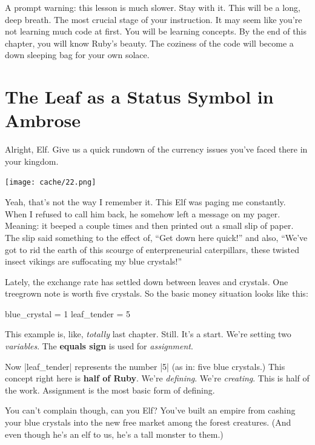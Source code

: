 \documentclass[12pt,twoside]{report}
\begin{document}
A prompt warning: this lesson is much slower.  Stay with it.  This
will be a long, deep breath. The most crucial stage of your
instruction.  It may seem like you're not learning much code at first.
You will be learning concepts.  By the end of this chapter, you will
know Ruby's beauty.  The coziness of the code will become a down
sleeping bag for your own solace.


\section{The Leaf as a Status Symbol in Ambrose}


Alright, Elf.  Give us a quick rundown of the currency issues you've
faced there in your kingdom.


\vspace{6pt}

	\texttt{[image: cache/22.png]}

\vspace{6pt}

Yeah, that's not the way I remember it.  This Elf was paging me
constantly.  When I refused to call him back, he somehow left a
message on my pager.  Meaning: it beeped a couple times and then
printed out a small slip of paper.  The slip said something to the
effect of, ``Get down here quick!'' and also, ``We've got to rid the
earth of this scourge of enterpreneurial caterpillars, these twisted
insect vikings are suffocating my blue crystals!''

Lately, the exchange rate has settled down between leaves and
crystals.  One treegrown note is worth five crystals.  So the basic
money situation looks like this:


\begin{rubycode}

 blue_crystal = 1 
 leaf_tender = 5

\end{rubycode}


This example is, like, {\em totally} last chapter.  Still.  It's a
start.  We're setting two {\em variables}. The {\bf equals sign} is
used for {\em assignment}.

Now \rubyinline|leaf_tender| represents the number
\rubyinline|5| (as in: five blue crystals.)  This
concept right here is {\bf half of Ruby}.  We're {\em defining}.
We're {\em creating}.  This is half of the work.  Assignment is the
most basic form of defining.

You can't complain though, can you Elf?  You've built an empire from
cashing your blue crystals into the new free market among the forest
creatures.  (And even though he's an elf to us, he's a tall monster to
them.)
\end{document}
